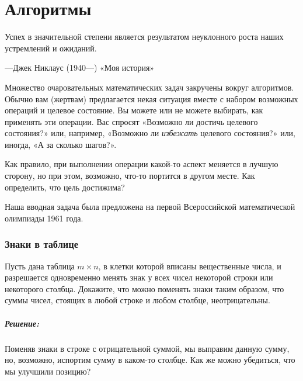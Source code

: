 \chapter*{Алгоритмы}


\setlength{\epigraphwidth}{.7\textwidth}
\epigraph{Успех в значительной степени является результатом неуклонного роста наших устремлений и ожиданий.}{---Джек Никлаус (1940---) «Моя история»}



Множество очаровательных математических задач закручены вокруг алгоритмов.
Обычно вам (жертвам) предлагается некая ситуация вместе с набором возможных операций и целевое состояние.
Вы можете или не можете выбирать, как применять эти операции.
Вас спросят «Возможно ли достичь целевого состояния?» или, например, «Возможно ли \emph{избежать} целевого состояния?» или, иногда, «А за сколько шагов?».

Как правило, при выполнении операции какой-то аспект меняется в лучшую сторону, но при этом, возможно, что-то портится в другом месте.
Как определить, что цель достижима?

Наша вводная задача была предложена на первой Всероссийской математической олимпиады 1961 года.

\subsection*{Знаки в таблице}%

Пусть дана таблица $m\times n$, в клетки которой вписаны вещественные числа, и разрешается одновременно менять знак у всех чисел некоторой строки или некоторого столбца.
Докажите, что можно поменять знаки таким образом, что суммы чисел, стоящих в любой строке и любом столбце, неотрицательны.

\paragraph{Решение:}
Поменяв знаки в строке с отрицательной суммой, мы выправим данную сумму, но, возможно, испортим сумму в каком-то столбце.
Как же можно убедиться, что мы улучшили позицию?

